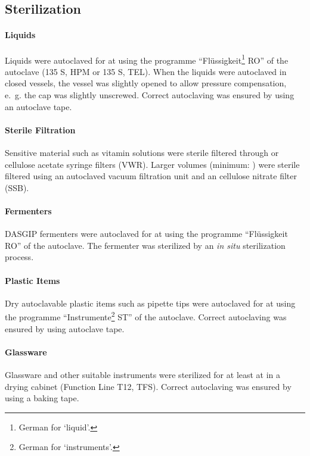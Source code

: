 \subsection{Sterilization}
\paragraph{Liquids}
Liquids were autoclaved for  at  using the programme \enquote{Flüssigkeit\footnote{German for \enquote{liquid}.} RO} of the autoclave (135 S, HPM or 135 S, TEL). When the liquids were autoclaved in closed vessels, the vessel was slightly opened to allow pressure compensation, e.~g. the cap was slightly unscrewed. Correct autoclaving was ensured by using an autoclave tape.

\paragraph{Sterile Filtration}
Sensitive material such as vitamin solutions were sterile filtered through  or  cellulose acetate syringe filters (VWR). Larger volumes (minimum: ) were sterile filtered using an autoclaved vacuum filtration unit and an  cellulose nitrate filter (SSB).

\paragraph{Fermenters}
DASGIP fermenters were autoclaved for  at  using the programme \enquote{Flüssigkeit RO} of the autoclave. The  fermenter was sterilized by an \textit{in situ} sterilization process.

\paragraph{Plastic Items}
Dry autoclavable plastic items such as pipette tips were autoclaved for  at  using the programme \enquote{Instrumente\footnote{German for \enquote{instruments}.} ST} of the autoclave. Correct autoclaving was ensured by using autoclave tape.

\paragraph{Glassware}
Glassware and other suitable instruments were sterilized for at least  at  in a drying cabinet (Function Line T12, TFS). Correct autoclaving was ensured by using a baking tape.
